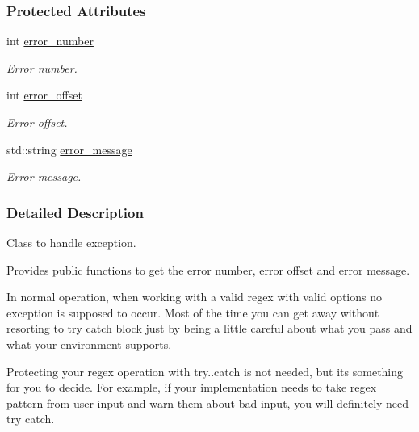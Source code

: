 \subsubsection*{Protected Attributes}
\begin{DoxyCompactItemize}
\item 
\hypertarget{classjpcre2_1_1Except_aa72e1a71b4cdf1d4baecce57b63caafc}{}\label{classjpcre2_1_1Except_aa72e1a71b4cdf1d4baecce57b63caafc} 
int \hyperlink{classjpcre2_1_1Except_aa72e1a71b4cdf1d4baecce57b63caafc}{error\+\_\+number}
\begin{DoxyCompactList}\small\item\em Error number. \end{DoxyCompactList}\item 
\hypertarget{classjpcre2_1_1Except_a12b09693ebee9b4a8b981ec1bd7506c4}{}\label{classjpcre2_1_1Except_a12b09693ebee9b4a8b981ec1bd7506c4} 
int \hyperlink{classjpcre2_1_1Except_a12b09693ebee9b4a8b981ec1bd7506c4}{error\+\_\+offset}
\begin{DoxyCompactList}\small\item\em Error offset. \end{DoxyCompactList}\item 
\hypertarget{classjpcre2_1_1Except_a88590c6c8c512608c1000639d527dd55}{}\label{classjpcre2_1_1Except_a88590c6c8c512608c1000639d527dd55} 
std\+::string \hyperlink{classjpcre2_1_1Except_a88590c6c8c512608c1000639d527dd55}{error\+\_\+message}
\begin{DoxyCompactList}\small\item\em Error message. \end{DoxyCompactList}\end{DoxyCompactItemize}


\subsubsection{Detailed Description}
Class to handle exception. 

Provides public functions to get the error number, error offset and error message.

In normal operation, when working with a valid regex with valid options no exception is supposed to occur. Most of the time you can get away without resorting to try catch block just by being a little careful about what you pass and what your environment supports.

Protecting your regex operation with try..catch is not needed, but it\textquotesingle{}s something for you to decide. For example, if your implementation needs to take regex pattern from user input and warn them about bad input, you will definitely need try catch.

